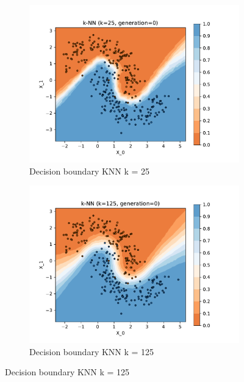 \documentclass[acmconf,nonacm=true]{acmart}
\begin{document}
\begin{enumerate}
\begin{enumerate}
        \begin{figure}[H]
            \centering
                \begin{subfigure}[t]{.495\textwidth}
                    \includegraphics[width =1.2\textwidth]{knn_k_25_gen_0.pdf}
                    \caption{Decision boundary KNN k = 25}
                    \label{fig:knn_25}
                \end{subfigure}
                \hfill
                \begin{subfigure}[t]{.495\textwidth}
                    \includegraphics[width =1.2\textwidth]{knn_k_125_gen_0.pdf}
                    \caption{Decision boundary KNN k = 125}
                    \label{fig:knn_125}
                \end{subfigure}
            \label{fig:knn_25_125}
        \end{figure}
        

\end{enumerate}
\end{enumerate}
\end{document}
